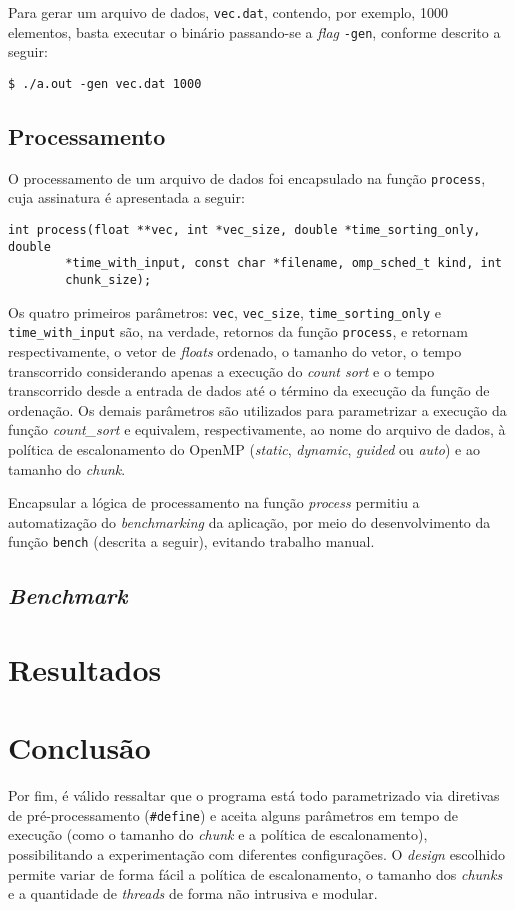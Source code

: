 \documentclass[12pt,a4paper]{article}
\begin{document}
Para gerar um arquivo de dados, \texttt{vec.dat}, contendo, por exemplo, 1000
elementos, basta executar o binário passando-se a \textit{flag} \texttt{-gen},
conforme descrito a seguir:

\begin{verbatim}
$ ./a.out -gen vec.dat 1000
\end{verbatim}

\subsection{Processamento}
O processamento de um arquivo de dados foi encapsulado na função
\texttt{process}, cuja assinatura é apresentada a seguir:

\begin{verbatim}
int process(float **vec, int *vec_size, double *time_sorting_only, double
        *time_with_input, const char *filename, omp_sched_t kind, int
        chunk_size);
\end{verbatim}

Os quatro primeiros parâmetros: \texttt{vec}, \texttt{vec\_size},
\texttt{time\_sorting\_only} e \texttt{time\_with\_input} são, na verdade, retornos
da função \texttt{process}, e retornam respectivamente, o vetor de
\textit{floats} ordenado, o tamanho do vetor, o tempo transcorrido considerando
apenas a execução do \textit{count sort} e o tempo transcorrido desde a entrada
de dados até o término da execução da função de ordenação. Os demais parâmetros
são utilizados para parametrizar a execução da função \textit{count\_sort} e
equivalem, respectivamente, ao nome do arquivo de dados, à política de
escalonamento do OpenMP (\textit{static}, \textit{dynamic}, \textit{guided} ou
\textit{auto}) e ao tamanho do \textit{chunk}.

Encapsular a lógica de processamento na função \textit{process} permitiu a
automatização do \textit{benchmarking} da aplicação, por meio do desenvolvimento
da função \texttt{bench} (descrita a seguir), evitando trabalho manual.

\subsection{\textit{Benchmark}}
 
\section{Resultados}


\section{Conclusão}
Por fim, é válido ressaltar que o programa está todo parametrizado via diretivas
de pré-processamento (\texttt{\#define}) e aceita alguns parâmetros em tempo de
execução (como o tamanho do \textit{chunk} e a política de escalonamento),
possibilitando a experimentação com diferentes configurações. O \textit{design}
escolhido permite variar de forma fácil a política de escalonamento, o tamanho
dos \textit{chunks} e a quantidade de \textit{threads} de forma não intrusiva e
modular.
\end{document}
